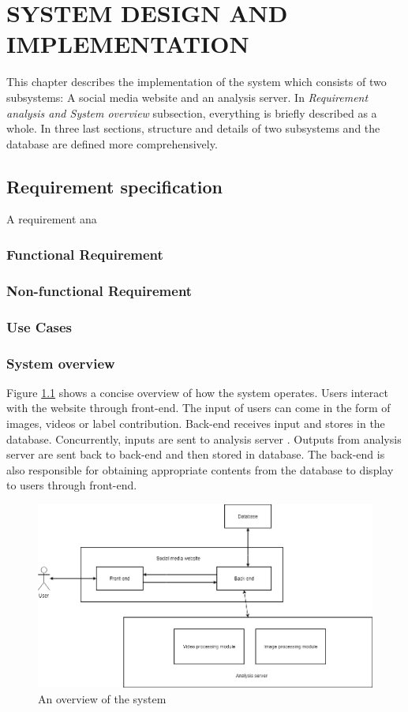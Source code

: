 \chapter{SYSTEM DESIGN AND IMPLEMENTATION}

This chapter describes the implementation of the system which consists of two subsystems: A social media website and an analysis server. In \textit{Requirement analysis and System overview} subsection, everything is briefly described as a whole. In three last sections, structure and details of two subsystems and the database are defined more comprehensively.

\section{Requirement specification}
A requirement ana
\subsection{Functional Requirement}
\subsection{Non-functional Requirement}
\subsection{Use Cases}

\subsection{System overview}
Figure \ref{chap3:system_overview_basic} shows a concise overview of how the system operates. Users interact with the website through front-end. The input of users can come in the form of images, videos or label contribution. Back-end receives input and stores in the database. Concurrently, inputs are sent to analysis server . Outputs from analysis server are sent back to back-end and then stored in database. The back-end is also responsible for obtaining appropriate contents from the database to display to users through front-end.

\begin{center}
    \begin{figure}[H]
    \centering
    \includegraphics[width=1\columnwidth]{images/chap3/system_overview_basic.png}
    \caption{An overview of the system}
    \label{chap3:system_overview_basic}
    \end{figure}
\end{center}
